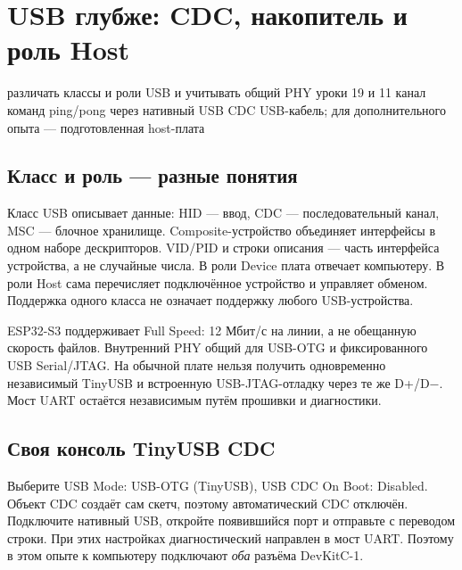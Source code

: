 \section{USB глубже: CDC, накопитель и роль Host}\label{les:usb-advanced}
\lessonintro
  {различать классы и роли USB и учитывать общий PHY}
  {уроки 19 и 11}
  {канал команд ping/pong через нативный USB CDC}
  {USB-кабель; для дополнительного опыта --- подготовленная host-плата}

\subsection{Класс и роль --- разные понятия}
Класс USB описывает данные: HID --- ввод, CDC --- последовательный канал,
MSC --- блочное хранилище. Composite-устройство объединяет интерфейсы в одном наборе дескрипторов.
VID/PID и строки описания --- часть интерфейса устройства, а не случайные числа.
В роли Device плата отвечает компьютеру. В роли Host сама перечисляет подключённое устройство
и управляет обменом. Поддержка одного класса не означает поддержку любого USB-устройства.

ESP32-S3 поддерживает Full Speed: 12 Мбит/с на линии, а не обещанную скорость файлов.
Внутренний PHY общий для USB-OTG и фиксированного USB Serial/JTAG. На обычной плате
нельзя получить одновременно независимый TinyUSB и встроенную USB-JTAG-отладку через те же D+/D−.
Мост UART остаётся независимым путём прошивки и диагностики.

\subsection{Своя консоль TinyUSB CDC}
Выберите USB Mode: USB-OTG (TinyUSB), USB CDC On Boot: Disabled.
Объект CDC создаёт сам скетч, поэтому автоматический CDC отключён.
Подключите нативный USB, откройте появившийся порт и отправьте  с переводом строки.
При этих настройках диагностический  направлен в мост UART.
Поэтому в этом опыте к компьютеру подключают \emph{оба} разъёма DevKitC-1.

